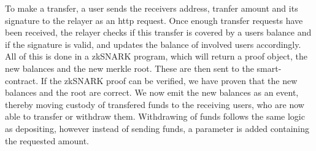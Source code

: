\documentclass[../thesis.tex]{subfiles}
\begin{document}
To make a transfer, a user sends the receivers address, tranfer amount and its signature to the relayer as an http request. Once enough transfer requests have been received, the relayer checks if this transfer is covered by a users balance and if the signature is valid, and updates the balance of involved users accordingly. All of this is done in a zkSNARK program, which will return a proof object, the new balances and the new merkle root. These are then sent to the smart-contract. If the zkSNARK proof can be verified, we have proven that the new balances and the root are correct. We now emit the new balances as an event, thereby moving custody of transfered funds to the receiving users, who are now able to transfer or withdraw them. Withdrawing of funds follows the same logic as depositing, however instead of sending funds, a parameter is added containing the requested amount. 
\end{document}

